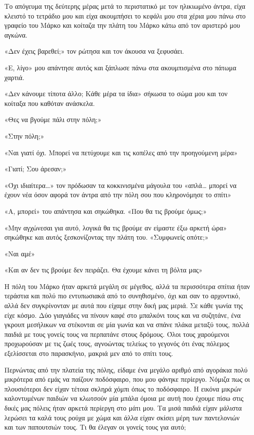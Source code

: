 \documentclass[12pt,twoside, openany]{book}
\begin{document}
Το απόγευμα της δεύτερης μέρας μετά το περιστατικό με τον ηλικιωμένο άντρα, είχα κλειστό το τετράδιο μου και είχα ακουμπήσει το κεφάλι μου στα χέρια μου πάνω στο γραφείο του Μάρκο και κοίταζα την πλάτη του Μάρκο κάτω από τον αριστερό μου αγκώνα.

«Δεν έχεις βαρεθεί;» τον ρώτησα και τον άκουσα να ξεφυσάει.

«Ε, λίγο» μου απάντησε αυτός και ξάπλωσε πάνω στα ακουμπισμένα στο πάτωμα χαρτιά.

«Δεν κάνουμε τίποτα άλλο; Κάθε μέρα τα ίδια» σήκωσα το σώμα μου και τον κοίταξα που καθόταν ανάσκελα.

«Θες να βγούμε πάλι στην πόλη;» 

«Στην πόλη;»

«Ναι γιατί όχι. Μπορεί να πετύχουμε και τις κοπέλες από την προηγούμενη μέρα»

«Γιατί; Σου άρεσαν;»

«Όχι ιδιαίτερα…» τον πρόδωσαν τα κοκκινισμένα μάγουλα του «απλά… μπορεί να έχουν νέα όσον αφορά τον άντρα από την πόλη σου που κληρονόμησε το σπίτι»

«Α, μπορεί» του απάντησα και σηκώθηκα. «Που θα τις βρούμε όμως;»

«Μην αγχώνεσαι για αυτό, λογικά θα τις βρούμε αν είμαστε έξω αρκετή ώρα» σηκώθηκε και αυτός ξεσκονίζοντας την πλάτη του. «Συμφωνείς οπότε;»

«Ναι αμέ»

«Και αν δεν τις βρούμε δεν πειράζει. Θα έχουμε κάνει τη βόλτα μας»

Η πόλη του Μάρκο ήταν αρκετά μεγάλη σε μέγεθος, αλλά τα περισσότερα σπίτια ήταν τεράστια και πολύ πιο εντυπωσιακά από το συνηθισμένο, όχι και σαν το αρχοντικό, αλλά δεν συγκρίνονταν με αυτά που είχαμε στην δική μας μεριά. Σε κάθε γωνία της είχε κόσμο. Δύο γιαγιάδες να πίνουν καφέ στο μπαλκόνι τους και να συζητάνε, ένα γκρουπ μεσήλικων να στέκονται σε μία γωνία και να σπάνε πλάκα μεταξύ τους, πολλά παιδιά με τους γονείς τους να περπατάνε στους δρόμους. Όλοι τους χαρούμενοι προχωρούσαν με τις ζωές τους, αγνοώντας τελείως το γεγονός ότι ένας πόλεμος εξελίσσεται στο παρασκήνιο, μακριά μεν από το σπίτι τους.

Περνώντας από την πλατεία της πόλης, είδαμε ένα μεγάλο αριθμό από αγοράκια πολύ μικρότερα από εμάς να παίζουν ποδόσφαιρο, που μου φάνηκε περίεργο. Νόμιζα πως οι πλουσιότεροι δεν είχαν τέτοια σκληρά χόμπι όπως το ποδόσφαιρο. Η εικόνα μικρών καλοντυμένων παιδιών να κλωτσούν μία μπάλα όμοια με αυτή που έχουμε πίσω στις δικές μας πόλεις ήταν αρκετά περίεργη στο μάτι μου. Τα μισά παιδιά είχαν μάλιστα λερώσει τα καλά τους ρούχα με χώμα και άλλα είχαν σκίσει μέρη των παντελονιών και των παπουτσιών τους. Τι θα έλεγαν οι γονείς τους για αυτό;
\end{document}
